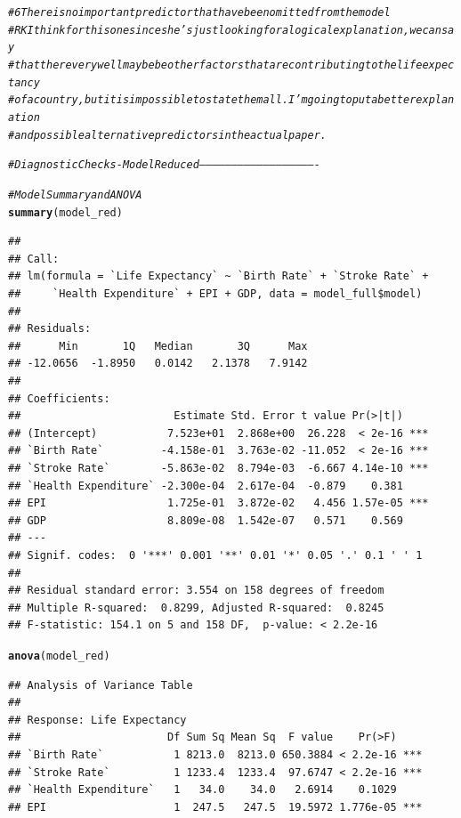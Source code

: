 \documentclass{article}\usepackage[]{graphicx}\usepackage[]{color}
\makeatletter
\newcommand{\hlcom}[1]{\textcolor[rgb]{0.678,0.584,0.686}{\textit{#1}}}%
\newcommand{\hlstd}[1]{\textcolor[rgb]{0.345,0.345,0.345}{#1}}%
\newcommand{\hlkwd}[1]{\textcolor[rgb]{0.737,0.353,0.396}{\textbf{#1}}}%
\newenvironment{kframe}{%
 \def\at@end@of@kframe{}%
 \ifinner\ifhmode%
  \def\at@end@of@kframe{\end{minipage}}%
  \begin{minipage}{\columnwidth}%
 \fi\fi%
 \def\FrameCommand##1{\hskip\@totalleftmargin \hskip-\fboxsep
 \colorbox{shadecolor}{##1}\hskip-\fboxsep
     \hskip-\linewidth \hskip-\@totalleftmargin \hskip\columnwidth}%
 \MakeFramed {\advance\hsize-\width
   \@totalleftmargin\z@ \linewidth\hsize
   \@setminipage}}%
 {\par\unskip\endMakeFramed%
 \at@end@of@kframe}
\newenvironment{knitrout}{}{} %
\makeatother
\begin{document}
\begin{knitrout}
{}


\begin{kframe}\begin{alltt}
\hlcom{# 6 There is no important predictor that have been omitted from the model}
\hlcom{# RK I think for this one since she's just looking for a logical explanation, we can say}
\hlcom{# that there very well maybe be other factors that are contributing to the life expectancy }
\hlcom{# of a country, but it is impossible to state them all. I'm going to put a better explanation}
\hlcom{# and possible alternative predictors in the actual paper. }


\hlcom{# Diagnostic Checks - Model Reduced -------------------------------------------------------}

\hlcom{# Model Summary and ANOVA}
\hlkwd{summary}\hlstd{(model_red)}
\end{alltt}
\begin{verbatim}
## 
## Call:
## lm(formula = `Life Expectancy` ~ `Birth Rate` + `Stroke Rate` + 
##     `Health Expenditure` + EPI + GDP, data = model_full$model)
## 
## Residuals:
##      Min       1Q   Median       3Q      Max 
## -12.0656  -1.8950   0.0142   2.1378   7.9142 
## 
## Coefficients:
##                        Estimate Std. Error t value Pr(>|t|)    
## (Intercept)           7.523e+01  2.868e+00  26.228  < 2e-16 ***
## `Birth Rate`         -4.158e-01  3.763e-02 -11.052  < 2e-16 ***
## `Stroke Rate`        -5.863e-02  8.794e-03  -6.667 4.14e-10 ***
## `Health Expenditure` -2.300e-04  2.617e-04  -0.879    0.381    
## EPI                   1.725e-01  3.872e-02   4.456 1.57e-05 ***
## GDP                   8.809e-08  1.542e-07   0.571    0.569    
## ---
## Signif. codes:  0 '***' 0.001 '**' 0.01 '*' 0.05 '.' 0.1 ' ' 1
## 
## Residual standard error: 3.554 on 158 degrees of freedom
## Multiple R-squared:  0.8299,	Adjusted R-squared:  0.8245 
## F-statistic: 154.1 on 5 and 158 DF,  p-value: < 2.2e-16
\end{verbatim}
\begin{alltt}
\hlkwd{anova}\hlstd{(model_red)}
\end{alltt}
\begin{verbatim}
## Analysis of Variance Table
## 
## Response: Life Expectancy
##                       Df Sum Sq Mean Sq  F value    Pr(>F)    
## `Birth Rate`           1 8213.0  8213.0 650.3884 < 2.2e-16 ***
## `Stroke Rate`          1 1233.4  1233.4  97.6747 < 2.2e-16 ***
## `Health Expenditure`   1   34.0    34.0   2.6914    0.1029    
## EPI                    1  247.5   247.5  19.5972 1.776e-05 ***

\end{verbatim}
\end{kframe}
\end{knitrout}
\end{document}
